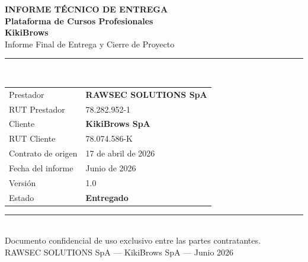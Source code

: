 \documentclass[a4paper,11pt]{article}
\begin{document}
\thispagestyle{empty}
\vspace*{18mm}

\begin{center}
  {\small\bfseries\color{gold}INFORME T\'ECNICO DE ENTREGA}\\[14pt]
  {\LARGE\bfseries\color{mainblack}
    Plataforma de Cursos Profesionales\\[6pt]KikiBrows}\\[12pt]
  {\large\color{midgray}Informe Final de Entrega y Cierre de Proyecto}\\[28pt]
  {\color{bordergray}\rule{0.45\linewidth}{0.4pt}}\\[22pt]
\end{center}

\begin{center}
\renewcommand{\arraystretch}{1.4}
\begin{tabular}{@{}ll@{}}
  \textcolor{midgray}{\small Prestador}         & \textbf{RAWSEC SOLUTIONS SpA} \\
  \textcolor{midgray}{\small RUT Prestador}      & 78.282.952-1 \\[4pt]
  \textcolor{midgray}{\small Cliente}            & \textbf{KikiBrows SpA} \\
  \textcolor{midgray}{\small RUT Cliente}        & 78.074.586-K \\[4pt]
  \textcolor{midgray}{\small Contrato de origen} & 17 de abril de 2026 \\
  \textcolor{midgray}{\small Fecha del informe}  & Junio de 2026 \\
  \textcolor{midgray}{\small Versi\'on}          & 1.0 \\
  \textcolor{midgray}{\small Estado}             & \textcolor{checkgreen}{\textbf{Entregado}} \\
\end{tabular}
\end{center}

\vfill

\begin{center}
  {\color{bordergray}\rule{\linewidth}{0.3pt}}\\[5pt]
  {\small\color{midgray}
    Documento confidencial de uso exclusivo entre las partes contratantes.\\
    RAWSEC SOLUTIONS SpA --- KikiBrows SpA --- Junio 2026}
\end{center}
\end{document}
